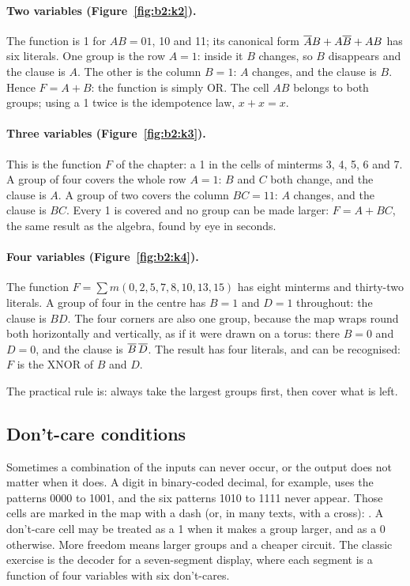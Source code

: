 \paragraph{Two variables (Figure~\ref{fig:b2:k2}).} The function is 1 for
$AB=01$, 10 and 11; its canonical form $\overline{A}B+A\overline{B}+AB$ has six
literals. One group is the row $A=1$: inside it $B$ changes, so $B$
disappears and the clause is $A$. The other is the column $B=1$: $A$ changes,
and the clause is $B$. Hence $F=A+B$: the function is simply OR. The cell
$AB$ belongs to both groups; using a 1 twice is the idempotence law,
$x+x=x$.

\paragraph{Three variables (Figure~\ref{fig:b2:k3}).} This is the function
$F$ of the chapter: a 1 in the cells of minterms 3, 4, 5, 6 and 7. A group of
four covers the whole row $A=1$: $B$ and $C$ both change, and the clause is
$A$. A group of two covers the column $BC=11$: $A$ changes, and the clause is
$BC$. Every 1 is covered and no group can be made larger: $F=A+BC$, the same
result as the algebra, found by eye in seconds.

\paragraph{Four variables (Figure~\ref{fig:b2:k4}).} The function
$F=\sum m(0,2,5,7,8,10,13,15)$ has eight minterms and thirty-two literals. A
group of four in the centre has $B=1$ and $D=1$ throughout: the clause is
$BD$. The four corners are also one group, because the map wraps round both
horizontally and vertically, as if it were drawn on a torus: there $B=0$ and
$D=0$, and the clause is $\overline{B}\,\overline{D}$. The result has four literals,
and can be recognised: $F$ is the XNOR of $B$ and $D$.

The practical rule is: always take the largest groups first, then cover what
is left.

\subsection{Don't-care conditions}

Sometimes a combination of the inputs can never occur, or the output does not
matter when it does. A digit in binary-coded decimal, for example, uses the
patterns 0000 to 1001, and the six patterns 1010 to 1111 never appear. Those
cells are marked in the map with a dash (or, in many texts, with a cross):
. A don't-care cell
may be treated as a 1 when it makes a group larger, and as a 0 otherwise.
More freedom means larger groups and a cheaper circuit. The classic
exercise is the decoder for a seven-segment display, where each segment is a
function of four variables with six don't-cares.

